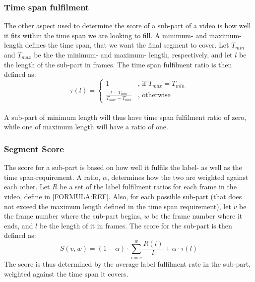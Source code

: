 \subsubsection{Time span fulfilment}
%
The other aspect used to determine the score of a sub-part of a video is how well it fits within the time span we are looking to fill. A minimum- and maximum- length defines the time span, that we want the final segment to cover. Let $T_{min}$ and $T_{max}$ be the the minimum- and maximum- length, respectively, and let $l$ be the length of the sub-part in frames. The time span fulfilment ratio is then defined as:\\
%
\begin{equation}
\tau(l) =
\begin{cases}
1 & \text{, if } T_{max} = T_{min}\\
\frac{l-T_{min}}{T_{max}-T_{min}} &  \text{, otherwise}
\end{cases}
\end{equation} 
%
\\
%
A sub-part of minimum length will thus have time span fulfilment ratio of zero, while one of maximum length will have a ratio of one. 
%
\subsubsection{Segment Score}
%
The score for a sub-part is based on how well it fulfils the label- as well as the time span-requirement. A ratio, $\alpha$, determines how the two are weighted against each other. Let $R$ be a set of the label fulfilment ratios for each frame in the video, define in [FORMULA:REF]. Also, for each possible sub-part (that does not exceed the maximum length defined in the time span requirement), let $v$ be the frame number where the sub-part begins, $w$ be the frame number where it ends, and $l$ be the length of it in frames. The score for the sub-part is then defined as:\\
%
\begin{equation}
S(v,w) =(1-\alpha) \cdot \sum_{i=v}^{w} \frac{R(i)}{l} + \alpha \cdot \tau(l)
\end{equation}
%
%
%
The score is thus determined by the average label fulfilment rate in the sub-part, weighted against the time span it covers.
%
